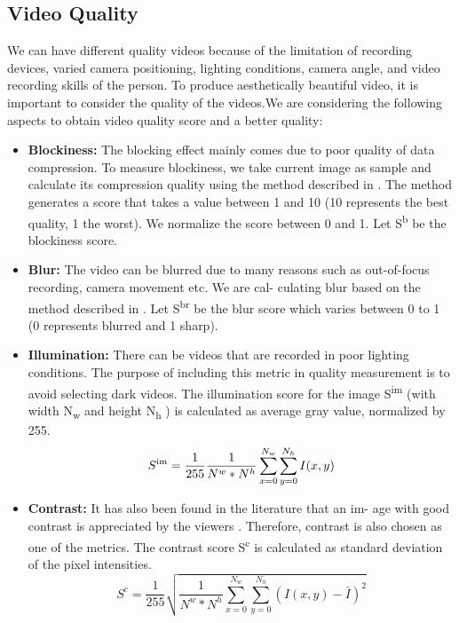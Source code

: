 \documentclass{sig-alternate-05-2015}
\begin{document}
\subsection{Video Quality}
We can have different quality videos because of the limitation of
recording devices, varied camera positioning, lighting conditions,
camera angle, and video recording skills of the person. To produce
aesthetically beautiful video, it is important to consider the quality
of the videos.We are considering the following aspects to obtain
video quality score and a better quality:
\begin{itemize}
\item \textbf{Blockiness:} The blocking effect mainly comes due to poor
quality of data compression. To measure blockiness, we take
current image as sample and calculate its compression quality using the method described in \cite{18}. The method generates
a score that takes a value between 1 and 10 (10 represents the
best quality, 1 the worst). We normalize the score between 0
and 1. Let S\textsuperscript{b} be the blockiness score.
\item \textbf{Blur:} The video can be blurred due to many reasons such as
out-of-focus recording, camera movement etc. We are cal-
culating blur based on the method described in \cite{5}. Let S\textsuperscript{br}
be the blur score which varies between 0 to 1 (0 represents
blurred and 1 sharp).
\item \textbf{Illumination:} There can be videos that are recorded in poor
lighting conditions. The purpose of including this metric in
quality measurement is to avoid selecting dark videos. The
illumination score for the image S\textsuperscript{im} (with width N\textsubscript{w} and
height N\textsubscript{h} ) is calculated as average gray value, normalized
by 255.
\begin{equation}
S\textsuperscript{im}=\frac{1}{255}\frac{1}{N^w \ast N^h} \sum_{x=0}^{N_w}\sum_{y=0}^{N_h} I(x,y) 
\end{equation}
\item 
\textbf{Contrast:} It has also been found in the literature that an im-
age with good contrast is appreciated by the viewers \cite{10}.
Therefore, contrast is also chosen as one of the metrics. The
contrast score S\textsuperscript{c} is calculated as standard deviation of the
pixel intensities.
\begin{equation}
S^c= \frac{1}{255}\sqrt{\frac{1}{N^w \ast N^h} \sum_{x=0}^{N_w}\sum_{y=0}^{N_h} (I(x,y)-\bar{I})^2}
\end{equation}

\end{itemize}
\end{document}
